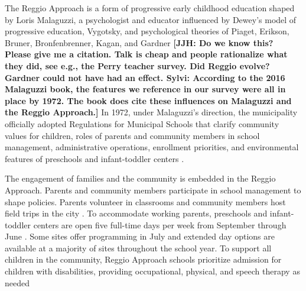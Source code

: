 The Reggio Approach is a form of progressive early childhood education shaped by Loris Malaguzzi, a psychologist and educator influenced by Dewey's model of progressive education, Vygotsky, and psychological theories of Piaget, Erikson, Bruner, Bronfenbrenner, Kagan, and Gardner \citep{Rinaldi_2006_ReggioEmilia_BOOK,Cagliari-etal-eds_2016_BOOK_Loris-Malaguzzi} \textbf{[JJH: Do we know this? Please give me a citation. Talk is cheap and people rationalize what they did, see e.g., the Perry teacher survey. Did Reggio evolve? Gardner could not have had an effect. Sylvi: According to the 2016 Malaguzzi book, the features we reference in our survey were all in place by 1972. The book does cite these influences on Malaguzzi and the Reggio Approach.]} In 1972, under Malaguzzi's direction, the municipality officially adopted Regulations for Municipal Schools that clarify community values for children, roles of parents and community members in school management, administrative operations, enrollment priorities, and environmental features of preschools and infant-toddler centers \citep{Giaroni_1972_Regulations-Municipal-EC-Schools}.

The engagement of families and the community is embedded in the Reggio Approach. Parents and community members participate in school management to shape policies. Parents volunteer in classrooms and community members host field trips in the city \citep{CEHD_2016_Historical-Analysis,Cagliari-etal-eds_2016_BOOK_Loris-Malaguzzi}. To accommodate working parents, preschools and infant-toddler centers are open five full-time days per week from September through June \citep{Giudici-Nicolosi_2014_Reggio-Approach}. Some sites offer programming in July and extended day options are available at a majority of sites throughout the school year. To support all children in the community, Reggio Approach schools prioritize admission for children with disabilities, providing occupational, physical, and speech therapy as needed \citep{Edwards-etal-eds_1998_Hundred-Languages,Giaroni_1972_Regulations-Municipal-EC-Schools}

